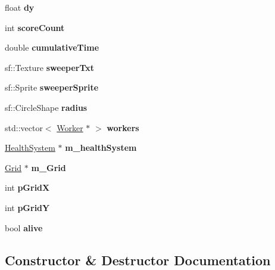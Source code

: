 \begin{DoxyCompactItemize}
float {\bfseries dy}
\item 
\mbox{\label{class_sweeper_a6694fb8d6805fc4047daa30fed18134c}} 
int {\bfseries score\+Count}
\item 
\mbox{\label{class_sweeper_a97334ecbd8da6b2657ff4b4243abef5b}} 
double {\bfseries cumulative\+Time}
\item 
\mbox{\label{class_sweeper_a4d7698326d4308e6467290e706bac026}} 
sf\+::\+Texture {\bfseries sweeper\+Txt}
\item 
\mbox{\label{class_sweeper_a1bbe960cea73933f579b8d8d80c43b59}} 
sf\+::\+Sprite {\bfseries sweeper\+Sprite}
\item 
\mbox{\label{class_sweeper_ac29ff5f130f3628c3dc8a6b1f08f7304}} 
sf\+::\+Circle\+Shape {\bfseries radius}
\item 
\mbox{\label{class_sweeper_add5430965fbeeed394b95023050cec72}} 
std\+::vector$<$ \mbox{\hyperlink{class_worker}{Worker}} $\ast$ $>$ {\bfseries workers}
\item 
\mbox{\label{class_sweeper_a8d00136cb889ffb5e74c713f17d4270a}} 
\mbox{\hyperlink{class_health_system}{Health\+System}} $\ast$ {\bfseries m\+\_\+health\+System}
\item 
\mbox{\label{class_sweeper_aa1aa2f58ac7d159f57e3cc2255cb896f}} 
\mbox{\hyperlink{class_grid}{Grid}} $\ast$ {\bfseries m\+\_\+\+Grid}
\item 
\mbox{\label{class_sweeper_a3907da71f596fd6def71c69710db4a4a}} 
int {\bfseries p\+GridX}
\item 
\mbox{\label{class_sweeper_ab514a255f1e417c8fe0ca2d2919db97c}} 
int {\bfseries p\+GridY}
\item 
\mbox{\label{class_sweeper_a7fcb20248b5697445b1101f99df6b27d}} 
bool {\bfseries alive}
\end{DoxyCompactItemize}


\subsection{Constructor \& Destructor Documentation}
\mbox{\label{class_sweeper_a6c4ed469055d3da0b584bdbe32e4292a}} 
